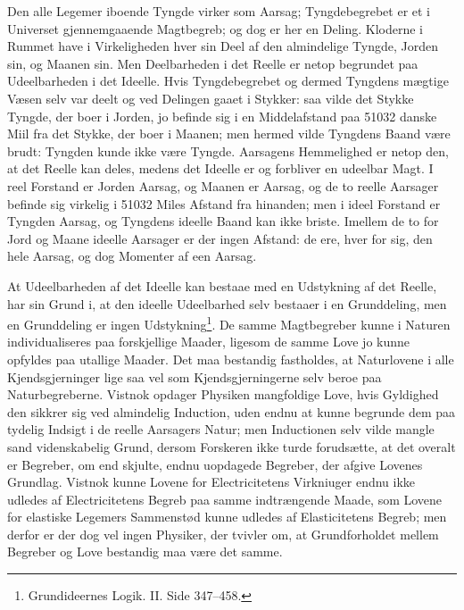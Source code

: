 \documentclass[12pt,a4paper]{book}
\begin{document}
Den alle Legemer iboende Tyngde virker som Aarsag; Tyngdebegrebet er et
i Universet gjennemgaaende Magtbegreb; og dog er her en Deling.
Kloderne i Rummet have i Virkeligheden hver sin Deel af den almindelige
Tyngde, Jorden sin, og Maanen sin. Men Deelbarheden i det Reelle er
netop begrundet paa Udeelbarheden i det Ideelle. Hvis Tyngdebegrebet og
dermed Tyngdens mægtige Væsen selv var deelt og ved Delingen gaaet i
Stykker: saa vilde det Stykke Tyngde, der boer i Jorden, jo befinde sig
i en Middelafstand paa 51032 danske Miil fra det Stykke, der boer i
Maanen; men hermed vilde Tyngdens Baand være brudt: Tyngden kunde ikke
være Tyngde. Aarsagens Hemmelighed er netop den, at det Reelle kan
deles, medens det Ideelle er og forbliver en udeelbar Magt. I reel
Forstand er Jorden Aarsag, og Maanen er Aarsag, og de to
reelle Aarsager befinde sig virkelig i 51032 Miles Afstand fra hinanden;
men i ideel Forstand er Tyngden Aarsag, og Tyngdens ideelle Baand kan
ikke briste. Imellem de to for Jord og Maane ideelle Aarsager er der
ingen Afstand: de ere, hver for sig, den hele Aarsag, og dog Momenter af
een Aarsag.

At Udeelbarheden af det Ideelle kan bestaae med en Udstykning af det
Reelle, har sin Grund i, at den ideelle Udeelbarhed selv bestaaer i en
Grunddeling, men en Grunddeling er ingen
Udstykning\footnote{%
Grundideernes Logik. II. Side 347--458.}. De samme Magtbegreber kunne i
Naturen individualiseres paa forskjellige Maader, ligesom de samme Love
jo kunne opfyldes paa utallige Maader. Det maa bestandig fastholdes, at
Naturlovene i alle Kjendsgjerninger lige saa vel som Kjendsgjerningerne
selv beroe paa Naturbegreberne. Vistnok opdager Physiken mangfoldige
Love, hvis Gyldighed den sikkrer sig ved almindelig Induction, uden endnu
at kunne begrunde dem paa tydelig Indsigt i de reelle Aarsagers Natur;
men Inductionen selv vilde mangle sand videnskabelig Grund, dersom
Forskeren ikke turde forudsætte, at det overalt er Begreber, om end
skjulte, endnu uopdagede Begreber, der afgive Lovenes Grundlag. Vistnok
kunne Lovene for Electricitetens
Virkniuger endnu ikke udledes af Electricitetens Begreb paa samme
indtrængende Maade, som Lovene for elastiske Legemers Sammenstød kunne
udledes af Elasticitetens Begreb; men derfor er der dog vel ingen
Physiker, der tvivler om, at Grundforholdet mellem Begreber og Love
bestandig maa være det samme.
\end{document}
